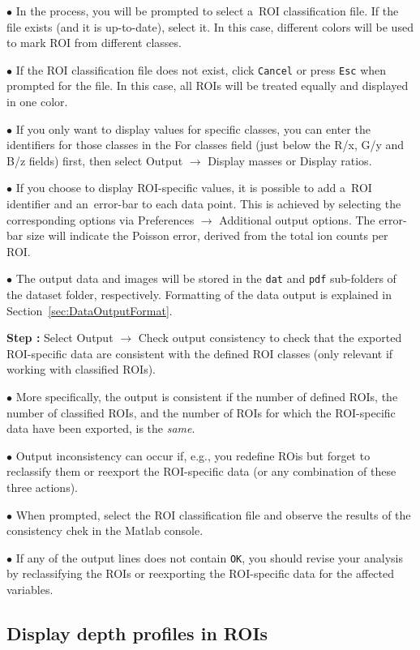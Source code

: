\documentclass[a4paper, 11pt]{article}
\newcommand{\ttt}[1]{\texttt{#1}}
\newcommand{\lans}[1]{{\color{magenta}#1}}
\newcommand{\lanstf}[1]{{\color{cyan}#1}}
\newcommand\ra{\rightarrow}
\newcounter{step}
\newcommand\s{\addtocounter{step}{1}\noindent\textbf{Step \thestep:}{ }}
\newcommand\bul{\noindent$\bullet${ }}
\begin{document}
\bul In the process, you will be prompted to select a~ROI classification file. If the file exists (and it is up-to-date), select it. In this case, different colors will be used to mark ROI from different classes. 

\bul If the ROI classification file does not exist, click \ttt{Cancel} or press \ttt{Esc} when prompted for the file. In this case, all ROIs will be treated equally and displayed in one color.

\bul If you only want to display values for specific classes, you can enter the identifiers for those classes in the \lanstf{For classes} field (just below the R/x, G/y and B/z fields) first, then select \lans{Output} $\ra$ \lans{Display masses} or \lans{Display ratios}.

\bul If you choose to display ROI-specific values, it is possible to add a~ROI identifier and an~error-bar to each data point. This is achieved by selecting the corresponding options via \lans{Preferences} $\ra$ \lans{Additional output options}. The error-bar size will indicate the Poisson error, derived from the total ion counts per ROI.

\bul The output data and images will be stored in the \ttt{dat} and \ttt{pdf} sub-folders of the dataset folder, respectively. Formatting of the data output is explained in Section~\ref{sec:DataOutputFormat}.

\s Select \lans{Output} $\ra$ \lans{Check output consistency} to check that the exported ROI-specific data are consistent with the defined ROI  classes (only relevant if working with classified ROIs). 

\bul More specifically, the output is consistent if the number of defined ROIs, the number of classified ROIs, and the number of ROIs for which the ROI-specific data have been exported, is the \emph{same}.

\bul Output inconsistency can occur if, e.g., you redefine ROis but forget to reclassify them or reexport the ROI-specific data (or any combination of these three actions).

\bul When prompted, select the ROI classification file and observe the results of the consistency chek in the Matlab console. 

\bul If any of the output lines does not contain \ttt{OK}, you should revise your analysis by reclassifying the ROIs or reexporting the ROI-specific data for the affected variables.


\subsection{Display depth profiles in ROIs}
\setcounter{step}{0}
\end{document}
